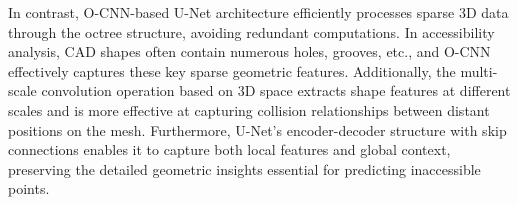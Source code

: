 In contrast, O-CNN-based U-Net architecture efficiently processes sparse 3D data through the octree structure, avoiding redundant computations. In accessibility analysis, CAD shapes often contain numerous holes, grooves, etc., and O-CNN effectively captures these key sparse geometric features. 
Additionally, the multi-scale convolution operation based on 3D space extracts shape features at different scales and is more effective at capturing collision relationships between distant positions on the mesh.
Furthermore, U-Net’s encoder-decoder structure with skip connections enables it to capture both local features and global context, preserving the detailed geometric insights essential for predicting inaccessible points.

